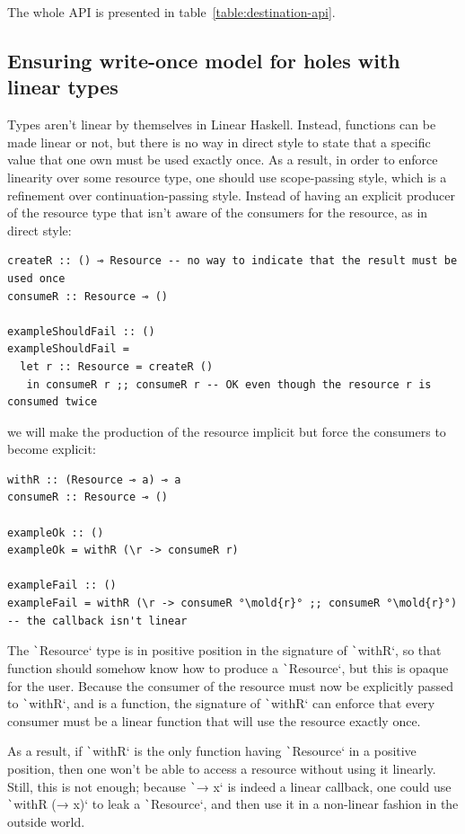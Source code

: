 \documentclass[english]{jflart}
\newcommand{\mold}[1]{\colorbox{red}{#1}}
\begin{document}
The whole API is presented in table~\ref{table:destination-api}.

\subsection{Ensuring write-once model for holes with linear types}\label{ssec:api-linearity}

Types aren't linear by themselves in Linear Haskell. Instead, functions can be made linear or not, but there is no way in direct style to state that a specific value that one own must be used exactly once. As a result, in order to enforce linearity over some resource type, one should use scope-passing style, which is a refinement over continuation-passing style. Instead of having an explicit producer of the resource type that isn't aware of the consumers for the resource, as in direct style:

{\small
\begin{verbatim}
createR :: () ⊸ Resource -- no way to indicate that the result must be used once
consumeR :: Resource ⊸ ()

exampleShouldFail :: ()
exampleShouldFail =
  let r :: Resource = createR ()
   in consumeR r ;; consumeR r -- OK even though the resource r is consumed twice
\end{verbatim}
}

we will make the production of the resource implicit but force the consumers to become explicit:

{\small
\begin{verbatim}
withR :: (Resource ⊸ a) ⊸ a
consumeR :: Resource ⊸ ()

exampleOk :: ()
exampleOk = withR (\r -> consumeR r)

exampleFail :: ()
exampleFail = withR (\r -> consumeR °\mold{r}° ;; consumeR °\mold{r}°) -- the callback isn't linear
\end{verbatim}
}

The \texttt`Resource` type is in positive position in the signature of \texttt`withR`, so that function should somehow know how to produce a \texttt`Resource`, but this is opaque for the user. Because the consumer of the resource must now be explicitly passed to \texttt`withR`, and is a function, the signature of \texttt`withR` can enforce that every consumer must be a linear function that will use the resource exactly once.

As a result, if \texttt`withR` is the only function having \texttt`Resource` in a positive position, then one won't be able to access a resource without using it linearly. Still, this is not enough; because \texttt`\x → x` is indeed a linear callback, one could use \texttt`withR (\x → x)` to leak a \texttt`Resource`, and then use it in a non-linear fashion in the outside world.
\end{document}
